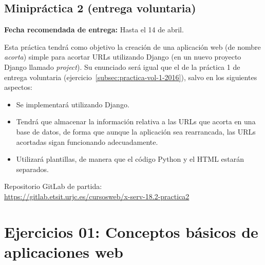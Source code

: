 \subsection{Minipráctica 2 (entrega voluntaria)}
\label{subsec:practica-vol-2-2015}

\textbf{Fecha recomendada de entrega:} Hasta el 14 de abril.

Esta práctica tendrá como objetivo la creación de una aplicación web (de nombre \emph{acorta}) simple para acortar URLs utilizando Django (en un nuevo proyecto Django llamado \emph{project}). Su enunciado será igual que el de la práctica 1 de entrega voluntaria (ejercicio~\ref{subsec:practica-vol-1-2016}), salvo en los siguientes aspectos:

\begin{itemize}
  \item Se implementará utilizando Django.
  \item Tendrá que almacenar la información relativa a las URLs que acorta en una base de datos, de forma que aunque la aplicación sea rearrancada, las URLs acortadas sigan funcionando adecuadamente.
  \item Utilizará plantillas, de manera que el código Python y el HTML estarán separados.
\end{itemize}


Repositorio GitLab de partida: \\
\url{https://gitlab.etsit.urjc.es/cursosweb/x-serv-18.2-practica2}

\newpage



\section{Ejercicios 01: Conceptos básicos de aplicaciones web}

